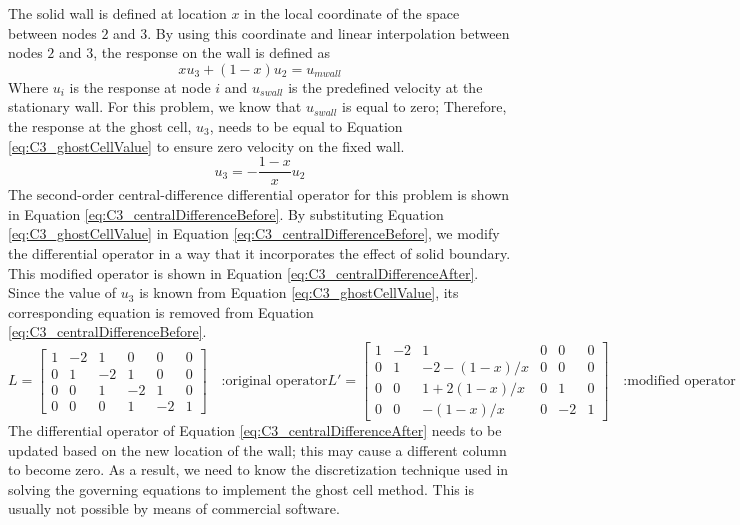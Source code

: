 %
The solid wall is defined at location $x$ in the local coordinate of the space between nodes $2$ and $3$. By using this coordinate and linear interpolation between nodes $2$ and $3$, the response on the wall is defined as
%
\begin{equation}
    x u_3 + (1 - x) u_2 = u_{mwall}
\end{equation}
%
Where $u_i$ is the response at node $i$ and $u_{swall}$ is the predefined velocity at the stationary wall. For this problem, we know that $u_{swall}$ is equal to zero; Therefore, the response at the ghost cell, $u_3$, needs to be equal to Equation \eqref{eq:C3_ghostCellValue} to ensure zero velocity on the fixed wall.
%
\begin{equation}\label{eq:C3_ghostCellValue}
    u_3 = -\frac{1 - x}{x} u_2
\end{equation}
%
The second-order central-difference differential operator for this problem is shown in Equation \eqref{eq:C3_centralDifferenceBefore}. By substituting Equation \eqref{eq:C3_ghostCellValue} in Equation \eqref{eq:C3_centralDifferenceBefore}, we modify the differential operator in a way that it incorporates the effect of solid boundary. This modified operator is shown in Equation \eqref{eq:C3_centralDifferenceAfter}. Since the value of $u_3$ is known from Equation \eqref{eq:C3_ghostCellValue}, its corresponding equation is removed from Equation \eqref{eq:C3_centralDifferenceBefore}.
%
\begin{subequations}
\begin{equation}\label{eq:C3_centralDifferenceBefore}
    L = 
    \begin{bmatrix}
    1 & -2 & 1 & 0 & 0 & 0 \\
    0 & 1 & -2 & 1 & 0 & 0 \\
    0 & 0 & 1 & -2 & 1 & 0 \\
    0 & 0 & 0 & 1 & -2 & 1
    \end{bmatrix} \quad \text{:original operator}
\end{equation}
\begin{equation}\label{eq:C3_centralDifferenceAfter}
    L' = 
    \begin{bmatrix}
    1 & -2 & 1 & 0 & 0 & 0 \\
    0 & 1 & -2-(1-x)/x & 0 & 0 & 0 \\
    0 & 0 & 1+2(1-x)/x & 0 & 1 & 0 \\
    0 & 0 & -(1-x)/x & 0 & -2 & 1
    \end{bmatrix} \quad \text{:modified operator}
\end{equation}
\end{subequations}
%
The differential operator of Equation \eqref{eq:C3_centralDifferenceAfter} needs to be updated based on the new location of the wall; this may cause a different column to become zero. As a result, we need to know the discretization technique used in solving the governing equations to implement the ghost cell method. This is usually not possible by means of commercial software.

